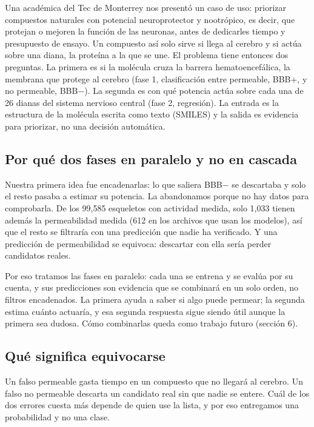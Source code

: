 \documentclass[letterpaper,11pt]{article}
\begin{document}
Una académica del Tec de Monterrey nos presentó un caso de uso: priorizar compuestos naturales con potencial neuroprotector y nootrópico, es decir, que protejan o mejoren la función de las neuronas, antes de dedicarles tiempo y presupuesto de ensayo. Un compuesto así solo sirve si llega al cerebro y si actúa sobre una diana, la proteína a la que se une. El problema tiene entonces dos preguntas. La primera es si la molécula cruza la barrera hematoencefálica, la membrana que protege al cerebro (fase 1, clasificación entre permeable, BBB+, y no permeable, BBB−). La segunda es con qué potencia actúa sobre cada una de 26 dianas del sistema nervioso central (fase 2, regresión). La entrada es la estructura de la molécula escrita como texto (SMILES) y la salida es evidencia para priorizar, no una decisión automática.

\subsection{Por qué dos fases en paralelo y no en cascada}

Nuestra primera idea fue encadenarlas: lo que saliera BBB− se descartaba y solo el resto pasaba a estimar su potencia. La abandonamos porque no hay datos para comprobarla. De los 99,585 esqueletos con actividad medida, solo 1,033 tienen además la permeabilidad medida (612 en los archivos que usan los modelos), así que el resto se filtraría con una predicción que nadie ha verificado. Y una predicción de permeabilidad se equivoca: descartar con ella sería perder candidatos reales.

Por eso tratamos las fases en paralelo: cada una se entrena y se evalúa por su cuenta, y sus predicciones son evidencia que se combinará en un solo orden, no filtros encadenados. La primera ayuda a saber si algo puede permear; la segunda estima cuánto actuaría, y esa segunda respuesta sigue siendo útil aunque la primera sea dudosa. Cómo combinarlas queda como trabajo futuro (sección 6).

\subsection{Qué significa equivocarse}

Un falso permeable gasta tiempo en un compuesto que no llegará al cerebro. Un falso no permeable descarta un candidato real sin que nadie se entere. Cuál de los dos errores cuesta más depende de quien use la lista, y por eso entregamos una probabilidad y no una clase.
\end{document}
